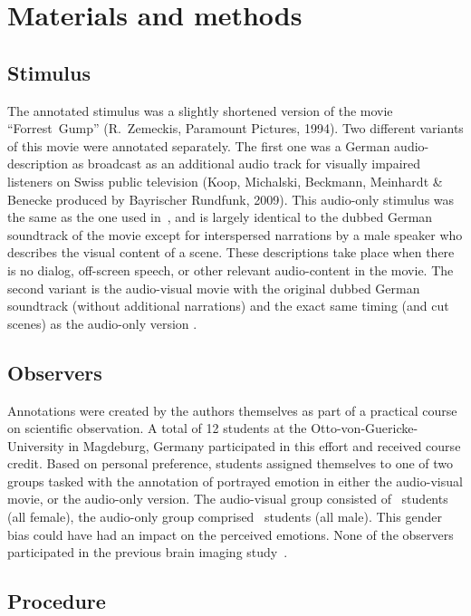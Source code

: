 \section*{Materials and methods} 

\subsection*{Stimulus}

The annotated stimulus was a slightly shortened version of the movie
``Forrest~Gump'' (R.~Zemeckis, Paramount Pictures, 1994). Two different
variants of this movie were annotated separately. The first one was a German
audio-description as broadcast as an additional audio track for visually
impaired listeners on Swiss public television (Koop, Michalski, Beckmann,
Meinhardt \& Benecke produced by Bayrischer Rundfunk, 2009). This audio-only
stimulus was the same as the one used in~\cite{HBI+14}, and is largely
identical to the dubbed German soundtrack of the movie except for interspersed
narrations by a male speaker who describes the visual content of a scene. These
descriptions take place when there is no dialog, off-screen speech, or other
relevant audio-content in the movie. The second variant is the audio-visual
movie with the original dubbed German soundtrack (without additional
narrations) and the exact same timing (and cut scenes) as the audio-only
version \cite[contains instructions on how to reproduce the stimulus from the
DVD release]{HBI+14}.

\subsection*{Observers}

Annotations were created by the authors themselves as part of a practical
course on scientific observation. A total of 12 students at the
Otto-von-Guericke-University in Magdeburg, Germany participated in this effort
and received course credit.  Based on personal preference, students assigned
themselves to one of two groups tasked with the annotation of portrayed emotion
in either the audio-visual movie, or the audio-only version. The audio-visual
group consisted of \AVTotalRaters\ students (all female), the audio-only group
comprised \AOTotalRaters\ students (all male). This gender bias could have had
an impact on the perceived emotions.  None of the observers participated in the
previous brain imaging study~\cite{HBI+14}.

\subsection*{Procedure}

